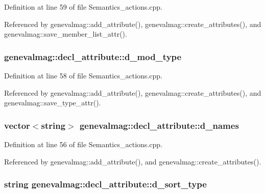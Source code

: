 Definition at line 59 of file Semantics\_\-actions.cpp.



Referenced by genevalmag::add\_\-attribute(), genevalmag::create\_\-attributes(), and genevalmag::save\_\-member\_\-list\_\-attr().

\hypertarget{structgenevalmag_1_1decl__attribute_a2b7f92bae66963a05669e87a7ccb1810}{
\subsubsection[{d\_\-mod\_\-type}]{ {\bf genevalmag::decl\_\-attribute::d\_\-mod\_\-type}}}
\label{structgenevalmag_1_1decl__attribute_a2b7f92bae66963a05669e87a7ccb1810}


Definition at line 58 of file Semantics\_\-actions.cpp.



Referenced by genevalmag::add\_\-attribute(), genevalmag::create\_\-attributes(), and genevalmag::save\_\-type\_\-attr().

\hypertarget{structgenevalmag_1_1decl__attribute_ac4ea14cc1989803540508a67dc7ff13c}{
\subsubsection[{d\_\-names}]{\setlength{\rightskip}{0pt plus 5cm}vector$<$string$>$ {\bf genevalmag::decl\_\-attribute::d\_\-names}}}
\label{structgenevalmag_1_1decl__attribute_ac4ea14cc1989803540508a67dc7ff13c}


Definition at line 56 of file Semantics\_\-actions.cpp.



Referenced by genevalmag::add\_\-attribute(), and genevalmag::create\_\-attributes().

\hypertarget{structgenevalmag_1_1decl__attribute_a124f1e6a8dc3316c94e8c3c61cc72254}{
\subsubsection[{d\_\-sort\_\-type}]{\setlength{\rightskip}{0pt plus 5cm}string {\bf genevalmag::decl\_\-attribute::d\_\-sort\_\-type}}}
\label{structgenevalmag_1_1decl__attribute_a124f1e6a8dc3316c94e8c3c61cc72254}


